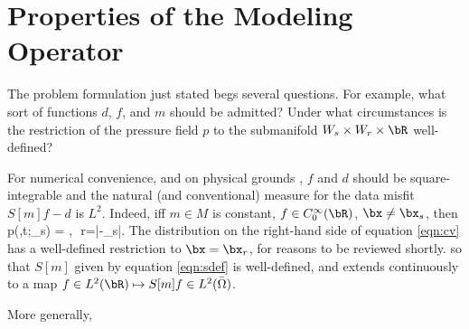 \section{Properties of the Modeling Operator}

The problem formulation just stated begs several questions. For
example, what sort of functions $d$, $f$, and $m$ should be admitted?
Under what circumstances is the restriction of the pressure field $p$
to the submanifold $W_s \times W_r \times \bR$ well-defined?

For numerical convenience, and on physical grounds
\cite[]{SantosaSymes:00}, $f$ and $d$ should be square-integrable and
the natural (and conventional) measure for the data misfit $S[m]f-d$
is $L^2$. Indeed, iff $m \in M$ is constant, $f \in C_0^{\infty}(\bR)$,
$\bx \ne \bx_s$, then
\be\label{eqn:cv} 
p(\bx,t;\bx_s) = 
, \,\,r=|\bx-\bx_s|.  
\ee 
The distribution on the right-hand side of equation \ref{eqn:cv} has a
well-defined restriction to $\bx=\bx_r$, for reasons to be reviewed
shortly. so that $S[m]$ given by
equation \ref{eqn:sdef} is well-defined, and extends continuously to a
map $f \in L^2(\bR) \mapsto S[m]f \in L^2(\bar{\Omega})$. 

More generally, 


